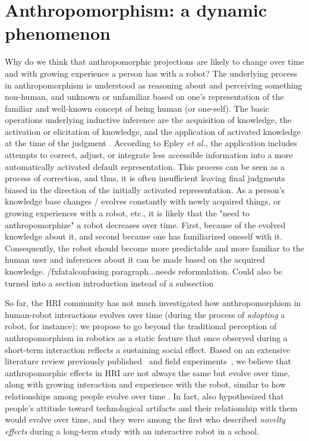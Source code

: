 \documentclass{frontiersSCNS} %
\begin{document}
\section{Anthropomorphism: a dynamic phenomenon}
\label{sec:our-ideas}

Why do we think that anthropomorphic projections are likely to change over time
and with growing experience a person has with a robot? The underlying process in
anthropomorphism is understood as reasoning about and perceiving something
non-human, and unknown or unfamiliar based on one's representation of the
familiar and well-known concept of being human (or one-self). The basic
operations underlying inductive inference are the acquisition of knowledge, the
activation or elicitation of knowledge, and the application of activated
knowledge at the time of the judgment \cite{epley_when_2008}. According to Epley
\textit{et al.}, the application includes attempts to correct, adjust, or
integrate less accessible information into a more automatically activated
default representation. This process can be seen as a process of correction, and
thus, it is often insufficient leaving final judgments biased in the direction
of the initially activated representation. As a person's knowledge base changes
/ evolves constantly with newly acquired things, or growing experiences with a
robot, etc., it is likely that the "need to anthropomorphize" a robot decreases
over time. First, because of the evolved knowledge about it, and second because
one has familiarized oneself with it. Consequently, the robot should become more
predictable and more familiar to the human user and inferences about it can be
made based on the acquired knowledge.  /fxfatal{confusing paragraph...needs
reformulation. Could also be turned into a section introduction instead of a
subsection}


So far, the HRI community has not much investigated how anthropomorphism in
human-robot interactions evolves over time (during the process of
\emph{adopting} a robot, for instance): we propose to go beyond the traditional
perception of anthropomorphism in robotics as a static feature that once
observed during a short-term interaction reflects a sustaining social effect.
Based on an extensive literature review previously
published~\cite{fink_anthropomorphism_2012} and field
experiments~, we believe that anthropomorphic effects in HRI are
not always the same but evolve over time, along with growing interaction and
experience with the robot, similar to how relationships among people evolve
over time . In fact, \cite{kanda_interactive_2004}
also hypothesized that people's attitude toward technological artifacts and
their relationship with them would evolve over time, and they were among the
first who described \emph{novelty effects} during a long-term study with an
interactive robot in a school.
\end{document}

